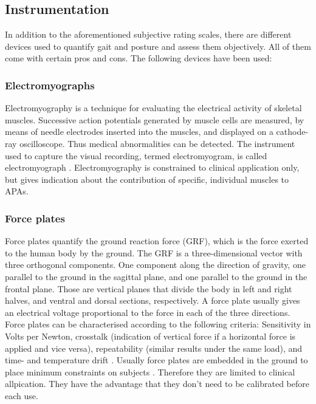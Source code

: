 \subsection{Instrumentation}

In addition to the aforementioned subjective rating scales, there are different devices used to quantify gait and posture and assess them objectively. All of them come with certain pros and cons. The following devices have been used:

\subsubsection{Electromyographs} Electromyography is a technique for evaluating the electrical activity of skeletal muscles. Successive action potentials generated by muscle cells are measured, by means of needle electrodes inserted into the muscles, and displayed on a cathode-ray oscilloscope. Thus medical abnormalities can be detected. The instrument used to capture the visual recording, termed electromyogram, is called electromyograph \cite{encyclopedia_britannica_electromyography_2014}. Electromyography is constrained to clinical application only, but gives indication about the contribution of specific, individual muscles to APAs.

\subsubsection{Force plates} Force plates quantify the ground reaction force (GRF), which is the force exerted to the human body by the ground. The GRF is a three-dimensional vector with three orthogonal components. One component along the direction of gravity, one parallel to the ground in the sagittal plane, and one parallel to the ground in the frontal plane. Those are vertical planes that divide the body in left and right halves, and ventral and dorsal sections, respectively. A force plate usually gives an electrical voltage proportional to the force in each of the three directions. Force plates can be characterised according to the following criteria: Sensitivity in Volts per Newton, crosstalk (indication of vertical force if a horizontal force is applied and vice versa), repeatability (similar results under the same load), and time- and temperature drift \cite{griffiths_principles_2006}. Usually force plates are embedded in the ground to place minimum constraints on subjects \cite{mancini_trunk_2011}. Therefore they are limited to clinical allpication. They have the advantage that they don't need to be calibrated before each use. 

